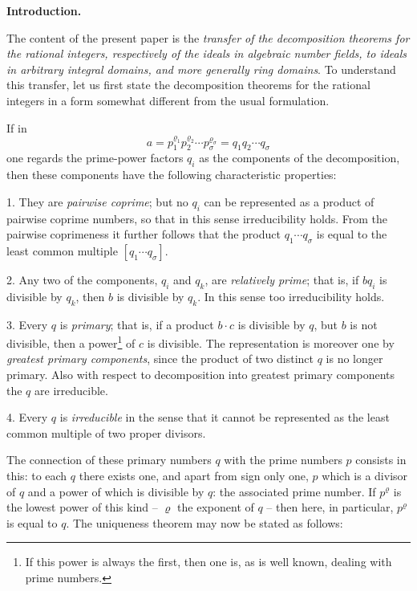 \documentclass[11pt]{article}
\begin{document}
\begin{center}\textbf{Introduction.}\end{center}
The content of the present paper is the \emph{transfer of the decomposition theorems for the rational integers, respectively of the ideals in algebraic number fields, to ideals in arbitrary integral domains, and more generally ring domains}. To understand this transfer, let us first state the decomposition theorems for the rational integers in a form somewhat different from the usual formulation.

If in
\[
 a=p_1^{\varrho_1}p_2^{\varrho_2}\cdots p_\sigma^{\varrho_\sigma}=q_1q_2\cdots q_\sigma
\]
one regards the prime-power factors $q_i$ as the components of the decomposition, then these components have the following characteristic properties:

1. They are \emph{pairwise coprime}; but no $q_i$ can be represented as a product of pairwise coprime numbers, so that in this sense irreducibility holds. From the pairwise coprimeness it further follows that the product $q_1\cdots q_\sigma$ is equal to the least common multiple $[q_1\cdots q_\sigma]$.

2. Any two of the components, $q_i$ and $q_k$, are \emph{relatively prime}; that is, if $bq_i$ is divisible by $q_k$, then $b$ is divisible by $q_k$. In this sense too irreducibility holds.

3. Every $q$ is \emph{primary}; that is, if a product $b\cdot c$ is divisible by $q$, but $b$ is not divisible, then a power\footnote{If this power is always the first, then one is, as is well known, dealing with prime numbers.} of $c$ is divisible. The representation is moreover one by \emph{greatest primary components}, since the product of two distinct $q$ is no longer primary. Also with respect to decomposition into greatest primary components the $q$ are irreducible.

4. Every $q$ is \emph{irreducible} in the sense that it cannot be represented as the least common multiple of two proper divisors.

The connection of these primary numbers $q$ with the prime numbers $p$ consists in this: to each $q$ there exists one, and apart from sign only one, $p$ which is a divisor of $q$ and a power of which is divisible by $q$: the associated prime number. If $p^\varrho$ is the lowest power of this kind -- $\varrho$ the exponent of $q$ -- then here, in particular, $p^\varrho$ is equal to $q$. The uniqueness theorem may now be stated as follows:
\end{document}
